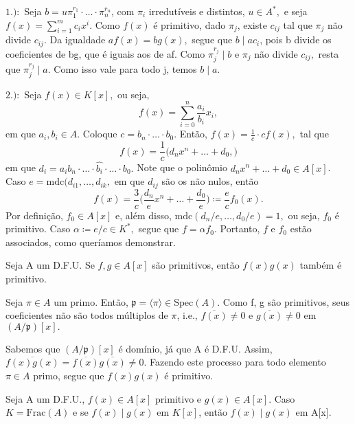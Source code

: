 \documentclass[AlgebraII/algebraII_notes.tex]{subfiles}
\begin{document}
\begin{proof*}
	\(1.):\) Seja \(b = u\pi_{1}^{r_{1}}\cdot \dotsc \cdot \pi_{n}^{r_{n}}\), com \(\pi_{i}\) irredutíveis e distintos, \(u\in A^{*},\)
	e seja \(f(x) = \sum\limits_{i=1}^{m}c_{i}x^{i}.\) Como \(f(x)\) é primitivo, dado \(\pi_{j}\), existe \(c_{ij}\) tal que \(\pi_{j}\)
	não divide \(c_{ij}.\) Da igualdade \(af(x) = bg(x),\) segue que \(b\mid ac_{i}\), pois b divide os coeficientes
	de bg, que é iguais aos de af. Como \(\pi_{j}^{r_{j}}\mid b\) e \(\pi_{j}\) não divide \(c_{ij},\) resta que \(\pi_{j}^{r_{j}}\mid a.\)
	Como isso vale para todo j, temos \(b\mid a.\)

	\(2.):\) Seja \(f(x)\in K[x],\) ou seja,
	\[
		f(x) = \sum\limits_{i=0}^{n}\frac{a_{i}}{b_{i}}x_{i},
	\]
	em que \(a_{i}, b_{i}\in A.\) Coloque \(c = b_{n}\cdot \dotsc \cdot b_{0}.\) Então,
	\(f(x) = \frac{1}{c} \cdot cf(x),\) tal que
	\[
		f(x) = \frac{1}{c}\biggl(d_{n}x^{n}+ \dotsc +d_{0},\biggr)
	\]
	em que \(d_{i} = a_{i}b_{n} \cdot \dotsc \cdot \hat{b_{i}}\cdot \dotsc \cdot b_{0}.\) Note que o polinômio
	\(d_{n}x^{n} + \dotsc  + d_{0}\in A[x]\).
	Caso \(e = \mathrm{mdc}(d_{i1}, \dotsc , d_{ik},\) em que \(d_{ij}\) são os não nulos, então
	\[
		f(x) = \frac{3}{c}\biggl(\frac{d_{n}}{e}x^{n} + \dotsc + \frac{d_{0}}{e}\biggr)\coloneqq \frac{e}{c}f_{0}(x).
	\]
	Por definição, \(f_{0}\in A[x]\) e, além disso, \(\mathrm{mdc}(d_{n}/e, \dotsc , d_{0}/e) = 1,\) ou seja, \(f_{0}\) é primitivo.
	Caso \(\alpha\coloneqq e/c \in K^{*},\) segue que \(f = \alpha f_{0}.\) Portanto, \(f\) e \(f_{0}\) estão associados, como queríamos demonstrar. \qedsymbol
\end{proof*}
\begin{lemma*}
	Seja A um D.F.U. Se \(f, g\in A[x]\) são primitivos, então \(f(x)g(x)\) também é primitivo.
\end{lemma*}
\begin{proof*}
	Seja \(\pi \in A\) um primo. Então, \(\mathfrak{p} = \langle \pi  \rangle\in \mathrm{Spec}(A).\) Como f, g
	são primitivos, seus coeficientes não são todos múltiplos de \(\pi \), i.e., \(\overline{f(x)}\neq 0\) e
	\(\overline{g(x)}\neq 0\) em \((A/\mathfrak{p})[x].\)

	Sabemos que \((A/\mathfrak{p})[x]\) é domínio, já que A é D.F.U. Assim, \(\overline{f(x)g(x)} = \overline{f(x)}\overline{g(x)}\neq0.\) Fazendo este processo para
	todo elemento \(\pi \in A\) primo, segue que \(f(x)g(x)\) é primitivo. \qedsymbol
\end{proof*}
\begin{lemma*}
	Seja A um D.F.U., \(f(x)\in A[x]\) primitivo e \(g(x)\in A[x].\) Caso \(K = \mathrm{Frac}(A)\) e se \(f(x)\mid g(x)\) em \(K[x]\), então
	\(f(x)\mid g(x)\) em A[x].
\end{lemma*}
\end{document}
